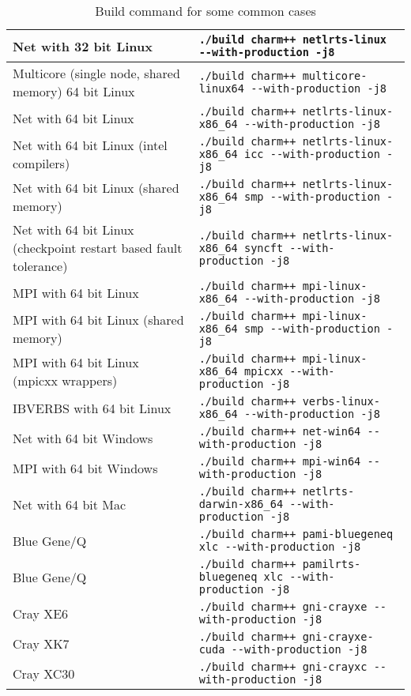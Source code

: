 \begin{table}[ht]
\begin{tabular}{|p{6cm}|p{9cm}|}
\hline
Net with 32 bit Linux & \verb|./build charm++ netlrts-linux --with-production -j8|
\\\hline
Multicore (single node, shared memory) 64 bit Linux & \verb|./build charm++ multicore-linux64 --with-production -j8|
\\\hline
Net with 64 bit Linux & \verb|./build charm++ netlrts-linux-x86_64 --with-production -j8|
\\\hline
Net with 64 bit Linux (intel compilers) & \verb|./build charm++ netlrts-linux-x86_64 icc --with-production -j8|
\\\hline
Net with 64 bit Linux (shared memory) & \verb|./build charm++ netlrts-linux-x86_64 smp --with-production -j8|
\\\hline
Net with 64 bit Linux (checkpoint restart based fault tolerance) & \verb|./build charm++ netlrts-linux-x86_64 syncft --with-production -j8|
\\\hline
MPI with 64 bit Linux & \verb|./build charm++ mpi-linux-x86_64 --with-production -j8|
\\\hline
MPI with 64 bit Linux (shared memory) & \verb|./build charm++ mpi-linux-x86_64 smp --with-production -j8|
\\\hline
MPI with 64 bit Linux (mpicxx wrappers) & \verb|./build charm++ mpi-linux-x86_64 mpicxx --with-production -j8|
\\\hline
IBVERBS with 64 bit Linux & \verb|./build charm++ verbs-linux-x86_64 --with-production -j8|
\\\hline
Net with 64 bit Windows & \verb|./build charm++ net-win64 --with-production -j8|
\\\hline
MPI with 64 bit Windows & \verb|./build charm++ mpi-win64 --with-production -j8|
\\\hline
Net with 64 bit Mac & \verb|./build charm++ netlrts-darwin-x86_64 --with-production -j8|
\\\hline
Blue Gene/Q & \verb|./build charm++ pami-bluegeneq xlc --with-production -j8|
\\\hline
Blue Gene/Q & \verb|./build charm++ pamilrts-bluegeneq xlc --with-production -j8|
\\\hline
Cray XE6 & \verb|./build charm++ gni-crayxe --with-production -j8|
\\\hline
Cray XK7 & \verb|./build charm++ gni-crayxe-cuda --with-production -j8|
\\\hline
Cray XC30 & \verb|./build charm++ gni-crayxc --with-production -j8|
\\\hline
\end{tabular}
\caption{Build command for some common cases}
\label{tab:buildlist}
\end{table}

